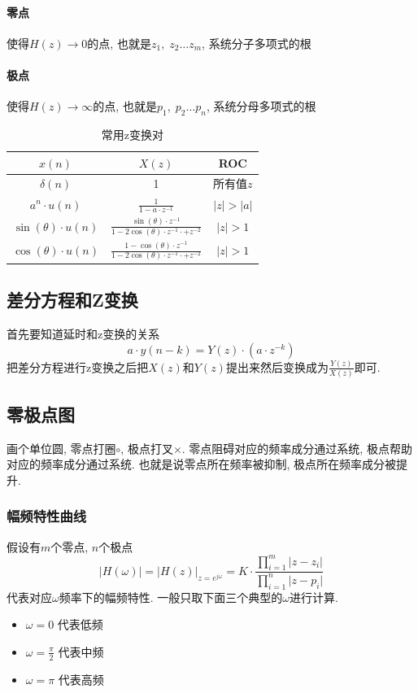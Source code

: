 \documentclass[a4paper]{report}
\begin{document}
\paragraph{零点} 使得$H(z)\rightarrow 0$的点, 也就是$z_1,\; z_2\dots z_m$, 系统分子多项式的根
\paragraph{极点} 使得$H(z)\rightarrow \infty$的点, 也就是$p_1,\; p_2\dots p_n$, 系统分母多项式的根

\begin{table}[H]
  \centering
    \begin{tabular}{ccc}
    $x(n)$ & $X(z)$&ROC \\
    \hline
    $\delta(n)$ & 1 & 所有值$z$\\
    $a^n\cdot u(n)$ & $\frac{1}{1-a\cdot z^{-1}}$&$\lvert z\rvert >\lvert a\rvert$  \\
    $\sin(\theta)\cdot u(n)$&$\frac{\sin(\theta)\cdot z^{-1}}{1-2\cos(\theta)\cdot z^{-1}\cdot +z^{-2}}$&$\lvert z\rvert >1$
    \\     $\cos(\theta)\cdot u(n)$&$\frac{1-\cos(\theta)\cdot z^{-1}}{1-2\cos(\theta)\cdot z^{-1}\cdot +z^{-2}}$&$\lvert z\rvert >1$
    \end{tabular}%

  \caption{常用z变换对}
\end{table}%

\subsection{差分方程和Z变换}
首先要知道延时和z变换的关系
\begin{equation}
  a\cdot y(n-k)=Y(z)\cdot(a\cdot z^{-k})
\end{equation}
把差分方程进行z变换之后把$X(z)$和$Y(z)$提出来然后变换成为$\frac{Y(z)}{X(z)}$即可. 
\subsection{零极点图}
画个单位圆, 零点打圈$\circ$, 极点打叉$\times$. 零点阻碍对应的频率成分通过系统, 极点帮助对应的频率成分通过系统. 也就是说零点所在频率被抑制, 极点所在频率成分被提升. 

\subsubsection{幅频特性曲线}
假设有$m$个零点, $n$个极点
\begin{equation}
  \lvert H(\omega)\rvert=\lvert H(z)\rvert_{z=e^{j\omega}}=K\cdot \frac{\displaystyle\prod_{i=1}^{m}\lvert z-z_i\rvert}{\displaystyle\prod_{i=1}^{n}\lvert z-p_i\rvert}
\end{equation}
代表对应$\omega$频率下的幅频特性. 一般只取下面三个典型的$\omega$进行计算. 
\begin{itemize}
  \item $\omega=0$ 代表低频
  \item $\omega=\frac{\pi}{2}$ 代表中频
  \item $\omega=\pi$ 代表高频
\end{itemize}
\end{document}
